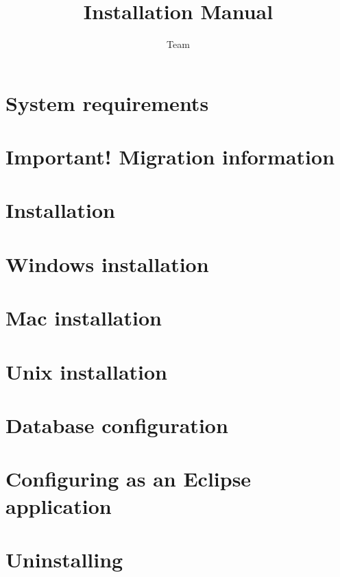 
%
\title{\app{} Installation Manual}
\author*{\app{} Team}{}
\maketitle


\tableofcontents
\renewcommand{\bxcomment}[2]{}%
\clearpage
\setcounter{secnumdepth}{2}%

\chapter{System requirements}

\clearpage
\chapter{Important! Migration information}

\clearpage
\chapter{Installation}

\clearpage
\chapter{Windows installation}

\clearpage
\chapter{Mac installation}

\clearpage
\chapter{Unix installation}
\label{Unix}

\clearpage
\chapter{Database configuration}


\chapter{Configuring \app{} as an Eclipse application}

\clearpage
\chapter{Uninstalling \app{}}

